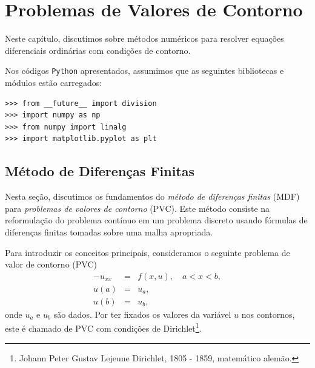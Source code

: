 
%

\chapter{Problemas de Valores de Contorno}

Neste capítulo, discutimos sobre métodos numéricos para resolver equações diferenciais ordinárias com condições de contorno.

\ifispython
Nos códigos \verb+Python+ apresentados, assumimos que as seguintes bibliotecas e módulos estão carregados:
\begin{verbatim}
>>> from __future__ import division
>>> import numpy as np
>>> from numpy import linalg
>>> import matplotlib.pyplot as plt
\end{verbatim}
\fi

\section{Método de Diferenças Finitas}

Nesta seção, discutimos os fundamentos do \emph{método de diferenças finitas} (MDF) para \emph{problemas de valores de contorno} (PVC). Este método consiste na reformulação do problema contínuo em um problema discreto usando fórmulas de diferenças finitas tomadas sobre uma malha apropriada.

Para introduzir os conceitos principais, consideramos o seguinte problema de valor de contorno (PVC)
\begin{eqnarray}
    -u_{xx} &=& f(x, u),\quad a < x < b,\label{eq:pvc1-eq}\\
    u(a) &=& u_a,\label{eq:pvc1-bc1}\\
    u(b) &=& u_b,\label{eq:pvc1-bc2}
\end{eqnarray}
onde $u_a$ e $u_b$ são dados. Por ter fixados os valores da variável $u$ nos contornos, este é chamado de PVC com condições de Dirichlet\footnote{Johann Peter Gustav Lejeune Dirichlet, 1805 - 1859, matemático alemão.}.

